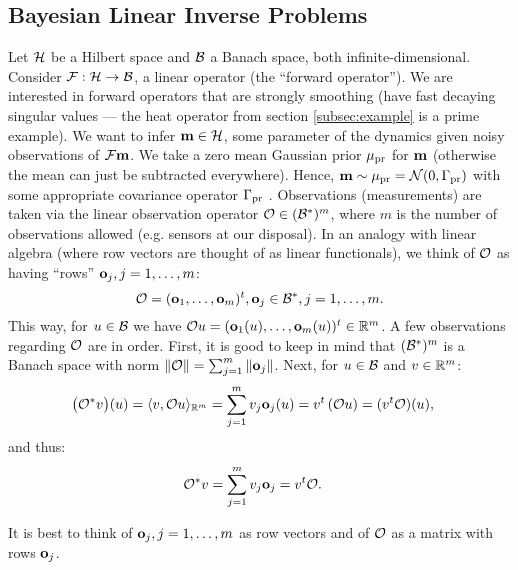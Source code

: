 \documentclass{amsart}
\numberwithin{equation}{section}
\begin{document}
\subsection{Bayesian Linear Inverse Problems}\label{section:abstract OED}
Let $\mathcal{H}$ be a Hilbert space and $\mathcal{B}$ a Banach space, both
infinite-dimensional. Consider $\mathcal{F}: \mathcal{H} \to \mathcal{B}$, a linear
operator (the ``forward operator''). We are interested in forward
operators that are strongly smoothing (have fast decaying singular
values --- the heat operator from section \ref{subsec:example} is a
prime example). We want to infer $\mathbf{m} \in \mathcal{H}$, some parameter of
the dynamics given noisy observations of $\mathcal{F} \mathbf{m}$. We take a zero
mean Gaussian prior $\mu_{\textup{pr}}$ for $\mathbf{m}$ (otherwise the mean can just be
subtracted everywhere). Hence, $\mathbf{m} \sim \mu_{\textup{pr}} = \mathcal{N}(0,\Gamma_{\textup{pr}})$
with some appropriate covariance operator $\Gamma_{\textup{pr}}$
\cite{Stuart10}. Observations (measurements) are taken via the linear
observation operator $\mathcal{O} \in ( \mathcal{B}^* )^m$, where $m$ is the number
of observations allowed (e.g. sensors at our disposal). In an analogy
with linear algebra (where row vectors are thought of as linear
functionals), we think of $\mathcal{O}$ as having ``rows'' $\mathbf{o}_j,
j=1,\dots,m$:
\begin{equation}\label{eq:O}
  \mathcal{O} = (\mathbf{o}_1,\dots, \mathbf{o}_m)^t, \mathbf{o}_j \in \mathcal{B}^*, j = 1,\dots,m.
\end{equation}
This way, for $u \in \mathcal{B}$ we have $\mathcal{O} u = (\mathbf{o}_1(u), \dots,
\mathbf{o}_m(u) )^t \in \mathbb{R}^m$.
A few observations regarding $\mathcal{O}$ are in order. First, it is good to
keep in mind that $( \mathcal{B}^* )^m$ is a Banach space with norm $\| \mathcal{O}
\| = \sum_{j=1}^m \|\mathbf{o}_j\|$. Next, for $u \in \mathcal{B}$ and $v\in
\mathbb{R}^m$:
\begin{align*}
  \big (\mathcal{O}^*v \big ) (u) &= \langle v, \mathcal{O} u \rangle_{\mathbb{R}^m} = \sum_{j=1}^m  v_j \mathbf{o}_j(u)
  = v^t \left ( \mathcal{O} u \right ) = (v^t \mathcal{O}) (u),
\end{align*}
and thus:
\begin{align}\label{eq:obs*}
  \mathcal{O}^*v &= \sum_{j=1}^m v_j \mathbf{o}_j = v^t \mathcal{O}.
\end{align}

\begin{observation}
  It is best to think of $\mathbf{o}_j,j=1,\dots,m$ as row vectors and of
  $\mathcal{O}$ as a matrix with rows $\mathbf{o}_j$. 
\end{observation}
\end{document}

